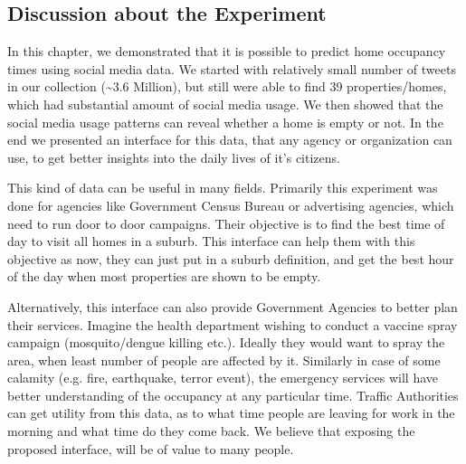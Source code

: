\documentclass[12pt]{report}
\theoremstyle{named}
\begin{document}
\subsection{Discussion about the Experiment}
In this chapter, we demonstrated that it is possible to predict home occupancy times using social media data. We started with relatively small number of tweets in our collection (\textasciitilde 3.6 Million), but still were able to find 39 properties/homes, which had substantial amount of social media usage. We then showed that the social media usage patterns can reveal whether a home is empty or not. In the end we presented an interface for this data, that any agency or organization can use, to get better insights into the daily lives of it's citizens. 

This kind of data can be useful in many fields. Primarily this experiment was done for agencies like Government Census Bureau or advertising agencies, which need to run door to door campaigns. Their objective is to find the best time of day to visit all homes in a suburb. This interface can help them with this objective as now, they can just put in a suburb definition, and get the best hour of the day when most properties are shown to be empty.

Alternatively, this interface can also provide Government Agencies to better plan their services. Imagine the health department wishing to conduct a vaccine spray campaign (mosquito/dengue killing etc.). Ideally they would want to spray the area, when least number of people are affected by it. Similarly in case of some calamity (e.g. fire, earthquake, terror event), the emergency services will have better understanding of the occupancy at any particular time. Traffic Authorities can get utility from this data, as to what time people are leaving for work in the morning and what time do they come back. We believe that exposing the proposed interface, will be of value to many people. 
\end{document}
